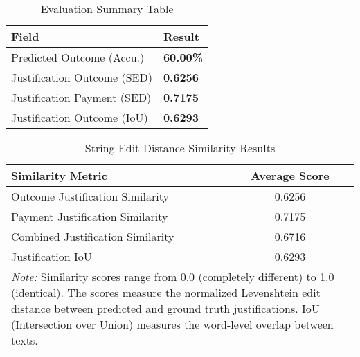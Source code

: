 
\begin{table}[H]
\centering
\caption{Evaluation Summary Table}
\label{tab:evaluation_summary}
\begin{tabular}{@{}lp{2cm}@{}}
\toprule
\textbf{Field} & \textbf{Result} \\
\midrule
Predicted Outcome (Accu.) & \textbf{60.00\%} \\
Justification Outcome (SED) &  \textbf{0.6256} \\
Justification Payment (SED) &  \textbf{0.7175} \\
Justification Outcome (IoU) &  \textbf{0.6293} \\
\bottomrule
\end{tabular}
\end{table}

\begin{table}[H]
\centering
\caption{String Edit Distance Similarity Results}
\label{tab:string_edit_distance_results}
\begin{tabular}{lc}
\toprule
\textbf{Similarity Metric} & \textbf{Average Score} \\
\midrule
Outcome Justification Similarity & 0.6256 \\
Payment Justification Similarity & 0.7175 \\
Combined Justification Similarity & 0.6716 \\
Justification IoU & 0.6293 \\
\midrule
\multicolumn{2}{p{13cm}}{\textit{Note:} Similarity scores range from 0.0 (completely different) to 1.0 (identical). 
The scores measure the normalized Levenshtein edit distance between predicted and ground truth justifications.
IoU (Intersection over Union) measures the word-level overlap between texts.} \\
\bottomrule
\end{tabular}
\end{table}

